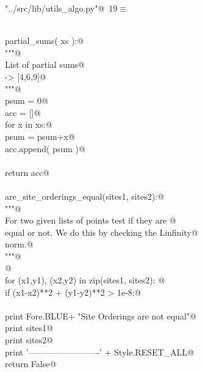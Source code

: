 \documentclass[11.5pt]{report}
\begin{document}
\begin{flushleft} \small\label{scrap12}\raggedright\small
{} \verb@"../src/lib/utils_algo.py"@\nobreak\ {\footnotesize {19}}$\equiv$
\vspace{-1ex}
\begin{list}{}{} \item
\mbox{}\verb@@\\
\mbox{}\verb@def partial_sums( xs ):@\\
\mbox{}\verb@    """@\\
\mbox{}\verb@    List of partial sums@\\
\mbox{}\verb@    [4,2,3] -> [4,6,9]@\\
\mbox{}\verb@    """@\\
\mbox{}\verb@    psum = 0@\\
\mbox{}\verb@    acc = []@\\
\mbox{}\verb@    for x in xs:@\\
\mbox{}\verb@        psum = psum+x@\\
\mbox{}\verb@        acc.append( psum )@\\
\mbox{}\verb@@\\
\mbox{}\verb@    return acc@\\
\mbox{}\verb@@\\
\mbox{}\verb@def are_site_orderings_equal(sites1, sites2):@\\
\mbox{}\verb@    """@\\
\mbox{}\verb@    For two given lists of points test if they are @\\
\mbox{}\verb@    equal or not. We do this by checking the Linfinity@\\
\mbox{}\verb@    norm.@\\
\mbox{}\verb@    """@\\
\mbox{}\verb@    @\\
\mbox{}\verb@    for (x1,y1), (x2,y2) in zip(sites1, sites2): @\\
\mbox{}\verb@        if (x1-x2)**2 + (y1-y2)**2 > 1e-8:@\\
\mbox{}\verb@@\\
\mbox{}\verb@            print Fore.BLUE+ "Site Orderings are not equal"@\\
\mbox{}\verb@            print sites1@\\
\mbox{}\verb@            print sites2@\\
\mbox{}\verb@            print '-------------------------' + Style.RESET_ALL@\\
\mbox{}\verb@            return False@\\

\end{list}
\end{flushleft}
\end{document}
